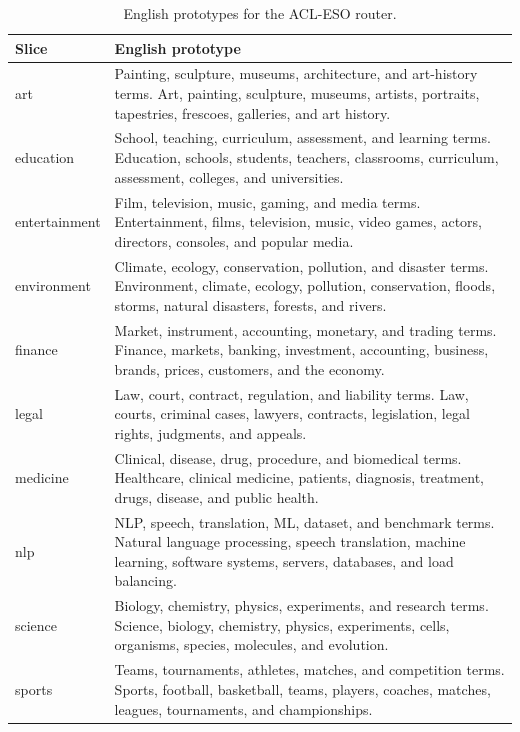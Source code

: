 \begin{table}[!t]
\centering
\small
\begin{tabularx}{\columnwidth}{@{}l@{\quad}X@{}}
\toprule
Slice & English prototype \\
\midrule
art & Painting, sculpture, museums, architecture, and art-history terms. Art, painting, sculpture, museums, artists, portraits, tapestries, frescoes, galleries, and art history. \\
education & School, teaching, curriculum, assessment, and learning terms. Education, schools, students, teachers, classrooms, curriculum, assessment, colleges, and universities. \\
entertainment & Film, television, music, gaming, and media terms. Entertainment, films, television, music, video games, actors, directors, consoles, and popular media. \\
environment & Climate, ecology, conservation, pollution, and disaster terms. Environment, climate, ecology, pollution, conservation, floods, storms, natural disasters, forests, and rivers. \\
finance & Market, instrument, accounting, monetary, and trading terms. Finance, markets, banking, investment, accounting, business, brands, prices, customers, and the economy. \\
legal & Law, court, contract, regulation, and liability terms. Law, courts, criminal cases, lawyers, contracts, legislation, legal rights, judgments, and appeals. \\
medicine & Clinical, disease, drug, procedure, and biomedical terms. Healthcare, clinical medicine, patients, diagnosis, treatment, drugs, disease, and public health. \\
nlp & NLP, speech, translation, ML, dataset, and benchmark terms. Natural language processing, speech translation, machine learning, software systems, servers, databases, and load balancing. \\
science & Biology, chemistry, physics, experiments, and research terms. Science, biology, chemistry, physics, experiments, cells, organisms, species, molecules, and evolution. \\
sports & Teams, tournaments, athletes, matches, and competition terms. Sports, football, basketball, teams, players, coaches, matches, leagues, tournaments, and championships. \\
\bottomrule
\end{tabularx}
\caption{English prototypes for the ACL-ESO router.}
\label{tab:router-prototypes}
\end{table}

